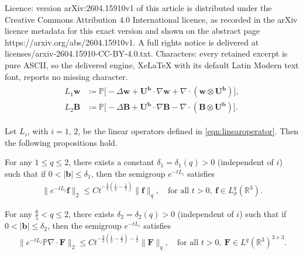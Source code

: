 \documentclass[10pt,a4paper]{amsart}
\newcommand{\BF}{{\boldsymbol{F}}}
\newcommand{\Bf}{{\boldsymbol{f}}}
\newcommand{\bB}{{\boldsymbol{B}}}
\newcommand{\bU}{{\boldsymbol{U}}}
\newcommand{\bb}{{\boldsymbol{b}}}
\newcommand{\bw}{{\boldsymbol{w}}}
\begin{document}
Licence: version arXiv:2604.15910v1 of this article is distributed under the Creative Commons Attribution 4.0 International licence, as recorded in the arXiv licence metadata for this exact version and shown on the abstract page https://arxiv.org/abs/2604.15910v1. A full rights notice is delivered at licenses/arxiv-2604.15910-CC-BY-4.0.txt. Characters: every retained excerpt is pure ASCII, so the delivered engine, XeLaTeX with its default Latin Modern text font, reports no missing character.
\begin{align}\label{eqn:linearoperator}
\begin{aligned}
L_1 \bw&\coloneqq \mathbb P \bigl[- \Delta\bw +  \bU^\bb\cdot \nabla\bw + \nabla\cdot  (\bw \otimes \bU^\bb)\bigr],\\
L_2 \bB&\coloneqq \mathbb P \bigl[- \Delta \bB + \bU^\bb \cdot \nabla \bB-\nabla\cdot (\bB \otimes \bU^\bb )\bigr].
\end{aligned}
\end{align}

\begin{proposition}\label{prop:decay} 
Let $L_i$, with $i =1,\,2$, be the linear operators defined in \cref{eqn:linearoperator}. Then the following propositions hold.
\begin{propenum}
\item \label{it:lmdecay1} For any $1 \le q \le 2$, there exists a constant $\delta_1=\delta_1(q)>0$ (independent of $i$) such that if $0<|\bb|\le \delta_1$, then the semigroup $e^{-tL_i}$ satisfies
\begin{align}\label{eqn:decay1}
\|e^{-tL_i} \Bf \|_2 \le Ct^{-\frac{3}{2}(\frac{1}{q}-\frac{1}{2})} \|\Bf\|_q,\quad \text{for all } t>0, \ \Bf \in  L^q_{\sigma}(\mathbb R^3). 
\end{align}

\item \label{it:lmdecay2}
For any $\frac{6}{5} < q \le 2$, there exists $\delta_2=\delta_2(q)>0$ (independent of $i$) such that if $0<|\bb|\le \delta_2$, then the semigroup $e^{-tL_i}$ satisfies
\begin{align}\label{eqn:decay2}
\|e^{-tL_i}\mathbb P \nabla\cdot \BF\|_2 
\le Ct^{ -\frac{3}{2}(\frac{1}{q}-\frac{1}{2}) -\frac{1}{2} } \| \BF \|_q,\quad \text{for all } t>0, \  \BF\in L^q(\mathbb R^3)^{3\times 3}. 
\end{align}
\end{propenum}
\end{proposition}
\end{document}
